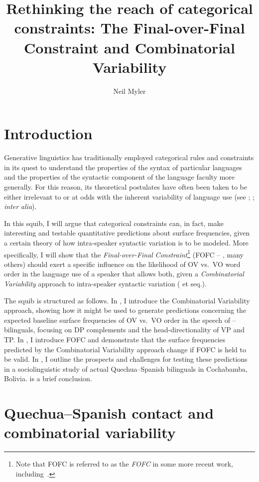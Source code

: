 \documentclass[output=paper]{langsci/langscibook}
\author{Neil Myler\affiliation{Boston University}}
\title{Rethinking the reach of categorical constraints: The Final-over-Final
Constraint and Combinatorial Variability}
\begin{document}
\glsresetall

\section{Introduction}

Generative linguistics has traditionally employed categorical rules and
constraints in its quest to understand the properties of the syntax of
particular languages and the properties of the syntactic component of the
language faculty more generally.  For this reason, its theoretical postulates
have often been taken to be either irrelevant to or at odds with the inherent
variability of language use (see \citealt{Guy2005}; \citealt{Newmeyer2005};
\emph{inter} \emph{alia}).

In this squib, I will argue that categorical constraints can, in fact, make
interesting and testable quantitative predictions about surface frequencies,
given a certain theory of how intra-speaker syntactic variation is to be
modeled.  More specifically, I will show that the \emph{Final-over-Final}
\emph{Constraint}\footnote{Note that \gls{FOFC} is referred to as
the \emph{\glsdesc{FOFC}} in some more recent work,
including~\textcite{SheeBibRobHol2017}.}
(\gls{FOFC} -- \citealt{BibHolRob2014,BibNewShee2009b,Holmberg2000,Walkden2009},
many others) should exert a specific influence on the likelihood of OV vs.\ VO
word order in the language use of a speaker that allows both, given a
\emph{Combinatorial} \emph{Variability} approach to intra-speaker syntactic
variation (\citealt{Adger2006} et seq.).

The squib is structured as follows.  In , I introduce the
Combinatorial Variability approach, showing how it might be used to generate
predictions concerning the expected baseline surface frequencies of OV vs.\ VO
order in the speech of -- bilinguals, focusing on DP complements
and the head-directionality of VP and TP\@. In , I introduce
FOFC and demonstrate that the surface frequencies predicted by the
Combinatorial Variability ap\-proach change if \gls{FOFC} is held to be valid.
In , I outline the prospects and challenges for testing
these predictions in a sociolinguistic study of actual Quechua--Spanish
bilinguals in Cochabamba, Bolivia.  is a brief conclusion.

\section{Quechua--Spanish contact and combinatorial
variability}\label{sec-30:key:1}
\end{document}
